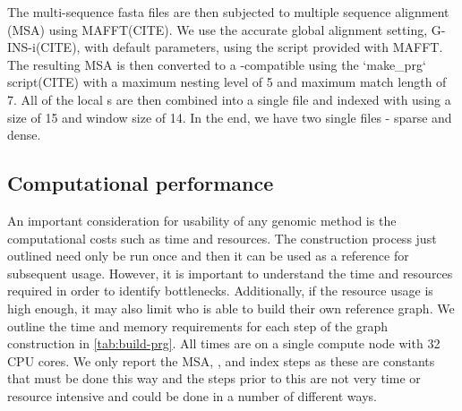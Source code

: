 The multi-sequence fasta files are then subjected to multiple sequence alignment (MSA) using MAFFT(CITE). We use the accurate global alignment setting, G-INS-i(CITE), with default parameters, using the  script provided with MAFFT. The resulting MSA is then converted to a \pandora{}-compatible \prg{} using the `make\_prg` script(CITE) with a maximum nesting level of 5 and maximum match length of 7. All of the local \prg{}s are then combined into a single \prg{} file and indexed with \pandora{} using a \kmer{} size of 15 and window size of 14. In the end, we have two single \prg{} files - sparse and dense.

\subsection{Computational performance}

An important consideration for usability of any genomic method is the computational costs such as time and resources. The construction process just outlined need only be run once and then it can be used as a reference for subsequent \pandora{} usage. However, it is important to understand the time and resources required in order to identify bottlenecks. Additionally, if the resource usage is high enough, it may also limit who is able to build their own reference graph. We outline the time and memory requirements for each step of the graph construction in \autoref{tab:build-prg}. All times are on a single compute node with 32 CPU cores. We only report the MSA, \makeprg{}, and \pandora{} index steps as these are constants that must be done this way and the steps prior to this are not very time or resource intensive and could be done in a number of different ways.

